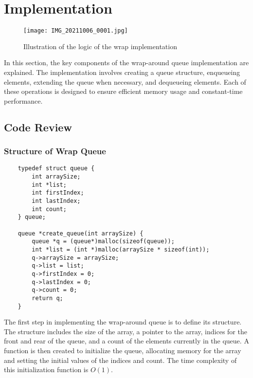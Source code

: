 \section*{Implementation}
\begin{figure}
    \centering
    \texttt{[image: IMG\_20211006\_0001.jpg]}
    \caption{Illustration of the logic of the wrap implementation}
    \label{fig:wrap_illustration}
\end{figure}
In this section, the key components of the wrap-around queue implementation are explained. The implementation involves creating a queue structure, enqueueing elements, extending the queue when necessary, and dequeueing elements. Each of these operations is designed to ensure efficient memory usage and constant-time performance.

\subsection*{Code Review}
\subsubsection*{Structure of Wrap Queue}
\begin{verbatim}
    typedef struct queue {
        int arraySize;
        int *list;
        int firstIndex;
        int lastIndex;
        int count;        
    } queue;

    queue *create_queue(int arraySize) {
        queue *q = (queue*)malloc(sizeof(queue));
        int *list = (int *)malloc(arraySize * sizeof(int));
        q->arraySize = arraySize;
        q->list = list;
        q->firstIndex = 0;
        q->lastIndex = 0;
        q->count = 0;
        return q;
    }
\end{verbatim}
The first step in implementing the wrap-around queue is to define its structure. The structure includes the size of the array, a pointer to the array, indices for the front and rear of the queue, and a count of the elements currently in the queue. A function is then created to initialize the queue, allocating memory for the array and setting the initial values of the indices and count. The time complexity of this initialization function is $O(1)$.

